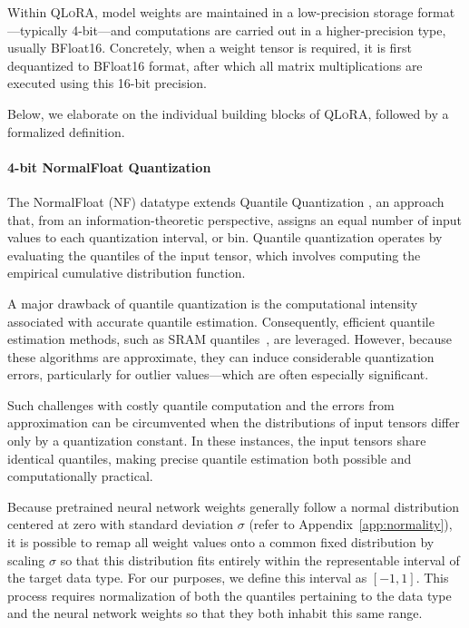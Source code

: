 Within \textsc{QLoRA}, model weights are maintained in a low-precision storage format—typically 4-bit—and computations are carried out in a higher-precision type, usually BFloat16. Concretely, when a weight tensor is required, it is first dequantized to BFloat16 format, after which all matrix multiplications are executed using this 16-bit precision.

Below, we elaborate on the individual building blocks of \textsc{QLoRA}, followed by a formalized definition.

\paragraph{4-bit NormalFloat Quantization} The NormalFloat (NF) datatype extends Quantile Quantization \citep{dettmers2022optimizers}, an approach that, from an information-theoretic perspective, assigns an equal number of input values to each quantization interval, or bin. Quantile quantization operates by evaluating the quantiles of the input tensor, which involves computing the empirical cumulative distribution function.

A major drawback of quantile quantization is the computational intensity associated with accurate quantile estimation. Consequently, efficient quantile estimation methods, such as SRAM quantiles~\citep{dettmers2022optimizers}, are leveraged. However, because these algorithms are approximate, they can induce considerable quantization errors, particularly for outlier values—which are often especially significant.

Such challenges with costly quantile computation and the errors from approximation can be circumvented when the distributions of input tensors differ only by a quantization constant. In these instances, the input tensors share identical quantiles, making precise quantile estimation both possible and computationally practical.

Because pretrained neural network weights generally follow a normal distribution centered at zero with standard deviation $\sigma$ (refer to Appendix~\ref{app:normality}), it is possible to remap all weight values onto a common fixed distribution by scaling $\sigma$ so that this distribution fits entirely within the representable interval of the target data type. For our purposes, we define this interval as $[-1, 1]$. This process requires normalization of both the quantiles pertaining to the data type and the neural network weights so that they both inhabit this same range.

